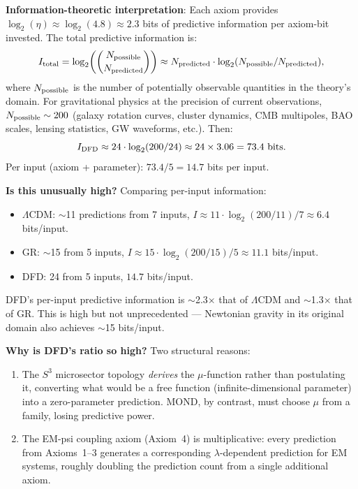 \documentclass[11pt]{article}
\theoremstyle{definition}
\theoremstyle{remark}
\begin{document}
\begin{tcolorbox}[colback=blue!5!white, colframe=blue!60!black,
  title=\textbf{W4i17 TOP 5 FINDINGS --- READ FIRST}]
\begin{enumerate}[nosep]
  \textbf{Information-theoretic interpretation}: Each axiom provides
  $\log_2(\eta) \approx \log_2(4.8) \approx 2.3$ bits of predictive
  information per axiom-bit invested. The total predictive information
  is:
  \begin{equation}
    I_{\rm total} = \log_2\!\left(\binom{N_{\rm possible}}{N_{\rm predicted}}\right)
    \approx N_{\rm predicted} \cdot \log_2(N_{\rm possible}/N_{\rm predicted}),
  \end{equation}
  where $N_{\rm possible}$ is the number of potentially observable
  quantities in the theory's domain. For gravitational physics at the
  precision of current observations, $N_{\rm possible} \sim 200$
  (galaxy rotation curves, cluster dynamics, CMB multipoles, BAO scales,
  lensing statistics, GW waveforms, etc.). Then:
  \begin{equation}
    I_{\rm DFD} \approx 24 \cdot \log_2(200/24) \approx 24 \times 3.06
    = 73.4 \text{ bits}.
  \end{equation}
  Per input (axiom + parameter): $73.4/5 = 14.7$ bits per input.

  \textbf{Is this unusually high?} Comparing per-input information:
  \begin{itemize}[nosep]
    \item $\Lambda$CDM: $\sim$11 predictions from 7 inputs,
      $I \approx 11 \cdot \log_2(200/11) / 7 \approx 6.4$ bits/input.
    \item GR: $\sim$15 from 5 inputs, $I \approx 15 \cdot
      \log_2(200/15)/5 \approx 11.1$ bits/input.
    \item DFD: 24 from 5 inputs, $14.7$ bits/input.
  \end{itemize}
  DFD's per-input predictive information is $\sim$2.3$\times$ that of
  $\Lambda$CDM and $\sim$1.3$\times$ that of GR. This is high but not
  unprecedented --- Newtonian gravity in its original domain also
  achieves $\sim$15 bits/input.

  \textbf{Why is DFD's ratio so high?} Two structural reasons:
  \begin{enumerate}[nosep]
    \item The $S^3$ microsector topology \emph{derives} the $\mu$-function
      rather than postulating it, converting what would be a free function
      (infinite-dimensional parameter) into a zero-parameter prediction.
      MOND, by contrast, must choose $\mu$ from a family, losing
      predictive power.
    \item The EM-psi coupling axiom (Axiom~4) is multiplicative: every
      prediction from Axioms~1--3 generates a corresponding
      $\lambda$-dependent prediction for EM systems, roughly doubling the
      prediction count from a single additional axiom.
  \end{enumerate}


\end{enumerate}
\end{tcolorbox}
\end{document}
